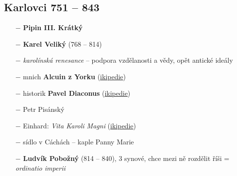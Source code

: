 \documentclass{article}
\begin{document}
\subsection*{Karlovci 751 -- 843}
\begin{itemize}
    \setlength\itemsep{0.15em}
    \item[$-$] \textbf{Pipin III. Krátký}
    \item[$-$] \textbf{Karel Veliký} (768 -- 814)
    \item[$-$] \textit{karolínská renesance} -- podpora vzdělanosti a vědy, opět antické ideály
    \item[$-$] mnich \textbf{Alcuin z Yorku} (\href{https://cs.wikipedia.org/wiki/Alcuin}{\faWikipediaW ikipedie})
    \item[$-$] historik \textbf{Pavel Diaconus} (\href{https://cs.wikipedia.org/wiki/Paulus_Diaconus}{\faWikipediaW ikipedie})
    \item[$-$] Petr Pisánský
    \item[$-$] Einhard: \textit{Vita Karoli Magni} (\href{https://cs.wikipedia.org/wiki/Vita_Karoli_Magni}{\faWikipediaW ikipedie})
    \item[$-$] sídlo v Cáchách -- kaple Panny  Marie
    \item[$-$] \textbf{Ludvík Pobožný} (814 -- 840), 3 synové, chce mezi ně rozdělit říši = \textit{ordinatio imperii}
\end{itemize}
\end{document}
